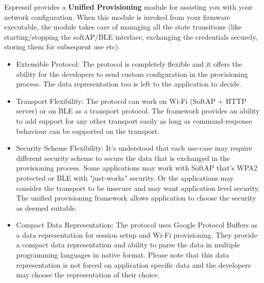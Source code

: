\documentclass[main.tex]{subfiles}
\begin{document}
Espressif provides a \textbf{Unified Provisioning} module for assisting you with your network configuration. When this module is invoked from your firmware executable, the module takes care of managing all the state transitions (like starting/stopping the softAP/BLE interface, exchanging the credentials securely, storing them for subsequent use etc).

\begin{itemize}

\item Extensible Protocol: The protocol is completely flexible and it offers the ability for the developers to send custom configuration in the provisioning process. The data representation too is left to the application to decide.
\item Transport Flexibility: The protocol can work on Wi-Fi (SoftAP + HTTP server) or on BLE as a transport protocol. The framework provides an ability to add support for any other transport easily as long as command-response behaviour can be supported on the transport.
\item Security Scheme Flexibility: It’s understood that each use-case may require different security scheme to secure the data that is exchanged in the provisioning process. Some applications may work with SoftAP that’s WPA2 protected or BLE with "just-works" security. Or the applications may consider the transport to be insecure and may want application level security. The unified provisioning framework allows application to choose the security as deemed suitable.
\item Compact Data Representation: The protocol uses Google Protocol Buffers as a data representation for session setup and Wi-Fi provisioning. They provide a compact data representation and ability to parse the data in multiple programming languages in native format. Please note that this data representation is not forced on application specific data and the developers may choose the representation of their choice.

\end{itemize}

\end{document}
